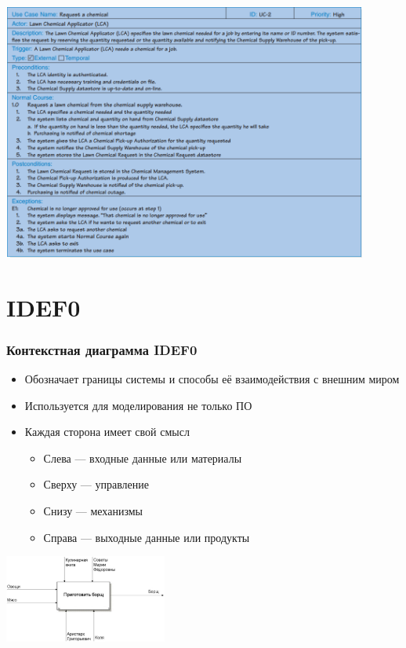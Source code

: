 \documentclass{../../slides-style}
\begin{document}
    \begin{frame}
        \begin{center}
            \includegraphics[width=0.9\textwidth]{useCaseExample.png}
        \end{center}
    \end{frame}

    \section{IDEF0}

    \begin{frame}
        \frametitle{Контекстная диаграмма IDEF0}
        \begin{itemize}
            \item Обозначает границы системы и способы её взаимодействия с внешним миром
            \item Используется для моделирования не только ПО
            \item Каждая сторона имеет свой смысл
            \begin{itemize}
                \item Слева --- входные данные или материалы
                \item Сверху --- управление
                \item Снизу --- механизмы
                \item Справа --- выходные данные или продукты
            \end{itemize}
        \end{itemize}
        \begin{center}
            \includegraphics[width=0.4\textwidth]{idef0Example.png}
        \end{center}
    \end{frame}
\end{document}
